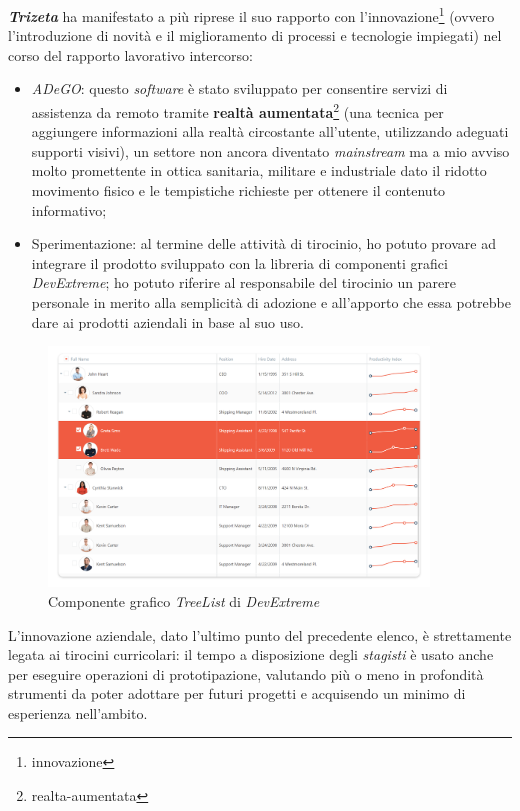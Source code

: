 \textit{\textbf{Trizeta}} ha manifestato a più riprese il suo rapporto con l'innovazione\footnote{\gls{innovazione}} (ovvero l'introduzione di novità e il miglioramento di processi e tecnologie impiegati) nel corso del rapporto lavorativo intercorso:
\begin{itemize}
    \item \textit{ADeGO}: questo \textit{software} è stato sviluppato per consentire servizi di assistenza da remoto tramite \textbf{realtà aumentata}\footnote{\gls{realta-aumentata}} (una tecnica per aggiungere informazioni alla realtà circostante all'utente, utilizzando adeguati supporti visivi), 
        un settore non ancora diventato \textit{mainstream} ma a mio avviso molto promettente in ottica sanitaria, militare e industriale dato il ridotto movimento fisico e le tempistiche richieste per ottenere il contenuto informativo;
    \item Sperimentazione: al termine delle attività di tirocinio, ho potuto provare ad integrare il prodotto sviluppato con la libreria di componenti grafici \textit{DevExtreme}; ho potuto riferire al responsabile del tirocinio un parere personale in merito alla semplicità di adozione e all'apporto che 
        essa potrebbe dare ai prodotti aziendali in base al suo uso.
\end{itemize}
\begin{figure}[H]
    \centering
    \includegraphics[width=0.9\textwidth]{images/tree-list.png}
    \caption[Componente grafico \textit{TreeList} di \textit{DevExtreme}]{Componente grafico \textit{TreeList} di \textit{DevExtreme}\footnotemark}
\end{figure}
{}
L'innovazione aziendale, dato l'ultimo punto del precedente elenco, è strettamente legata ai tirocini curricolari: il tempo a disposizione degli \textit{stagisti} è usato anche per eseguire operazioni di prototipazione, 
valutando più o meno in profondità strumenti da poter adottare per futuri progetti e acquisendo un minimo di esperienza nell'ambito.
